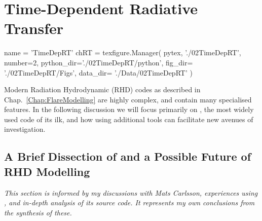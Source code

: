 \chapter{Time-Dependent Radiative Transfer}\label{Chap:TimeDepRt}
\begin{pycode}[TimeDepRT]
name = 'TimeDepRT'
chRT = texfigure.Manager(
    pytex,
    './02TimeDepRT',
    number=2,
    python_dir='./02TimeDepRT/python',
    fig_dir=   './02TimeDepRT/Figs',
    data_dir=  './Data/02TimeDepRT'
)
\end{pycode}



Modern Radiation Hydrodynamic (RHD) codes as described in Chap.~\ref{Chap:FlareModelling} are highly complex, and contain many specialised features.
In the following discussion we will focus primarily on \Radyn{}, the most widely used code of its ilk, and how using additional tools can facilitate new avenues of investigation.

\section{A Brief Dissection of \Radyn{} and a Possible Future of RHD Modelling}\label{Sec:RadynDissection}

\emph{This section is informed by my discussions with Mats Carlsson, experiences using \Radyn{}, and in-depth analysis of its source code. It represents my own conclusions from the synthesis of these.}

